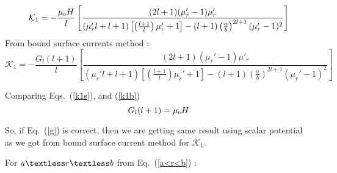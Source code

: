 \begin{equation}\label{k1s}
\mathcal{K}_1=-\frac{\mu_{\scriptscriptstyle 0} H}{l}\left[\frac{(2l+1)(\mu_r'-1)\mu'_r}{(\mu_r'l+l+1)\left[\left(\frac{l+1}{l}\right)\mu_r'+1\right]-(l+1)\left(\frac{a}{b}\right)^{2l+1}(\mu_r'-1)^2}\right]
\end{equation}
From bound surface currents method :
\begin{equation}\label{k1b}
\mathcal{K}_1=-\frac{G_l (l+1)}{l}\left[\frac{(2l+1)(\mu_r'-1)\mu'_r}{(\mu_r'l+l+1)\left[\left(\frac{l+1}{l}\right)\mu_r'+1\right]-(l+1)\left(\frac{a}{b}\right)^{2l+1}(\mu_r'-1)^2}\right]
\end{equation}

Comparing Eqs.~(\ref{k1s}), and (\ref{k1b})
\begin{equation}\label{g}
G_l(l+1)=\mu_{\scriptscriptstyle 0} H
\end{equation}

So, if Eq.~(\ref{g}) is correct, then we are getting same result using scalar potential as we got from bound surface current method for $\mathcal{K}_1$.

For \(a\textless r\textless b \) from Eq.~(\ref{a<r<b}) :

